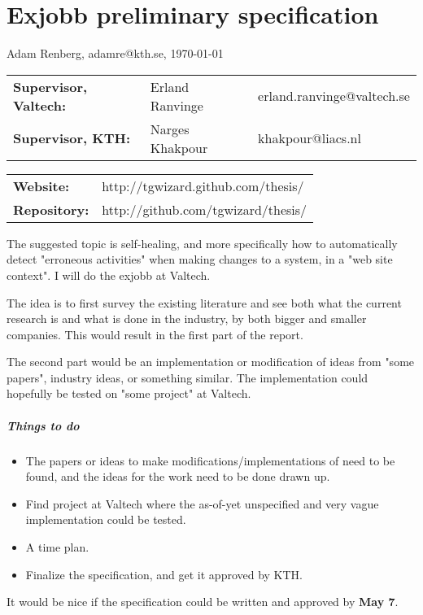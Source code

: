 \documentclass[a4paper,11pt]{kth-mag}
\begin{document}
\removepagenumbers%
\setlength\parindent{0em}
\setlength\parskip{1em}

\pagestyle{empty}


\chapter*{Exjobb preliminary specification}

Adam Renberg, adamre@kth.se, \today

\begin{tabular}{lll}
	\textbf{Supervisor, Valtech:} & Erland Ranvinge & erland.ranvinge@valtech.se \\
    \textbf{Supervisor, KTH:}     & Narges Khakpour & khakpour@liacs.nl \\
\end{tabular}

\begin{tabular}{ll}
    \textbf{Website:} & http://tgwizard.github.com/thesis/ \\
    \textbf{Repository:} & http://github.com/tgwizard/thesis/ \\
\end{tabular}

The suggested topic is self-healing, and more specifically how to automatically detect "erroneous activities" when making changes to a system, in a "web site context". I will do the exjobb at Valtech.

The idea is to first survey the existing literature and see both what the current research is and what is done in the industry, by both bigger and smaller companies. This would result in the first part of the report.

The second part would be an implementation or modification of ideas from "some papers", industry ideas, or something similar. The implementation could hopefully be tested on "some project" at Valtech.

\paragraph{Things to do}

\begin{itemize}

\item The papers or ideas to make modifications/implementations of need to be found, and the ideas for the work need to be done drawn up.

\item Find project at Valtech where the as-of-yet unspecified and very vague implementation could be tested.

\item A time plan.

\item Finalize the specification, and get it approved by KTH.

\end{itemize}

It would be nice if the specification could be written and approved by \textbf{May 7}.
\end{document}
